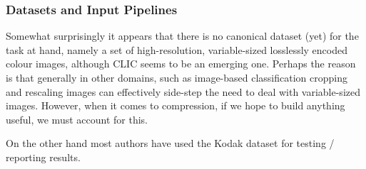 \documentclass{article}
\begin{document}
\subsubsection{Datasets and Input Pipelines}
\par
Somewhat surprisingly it appears that there is no canonical dataset (yet) for
the task at hand, namely a set of high-resolution, variable-sized losslessly
encoded colour images,
although CLIC \cite{clic2018} seems to be an emerging one. Perhaps the reason is
that generally in other domains, such as image-based classification cropping and
rescaling images can effectively side-step the need to deal with variable-sized
images. However, when it comes to compression, if we hope to build anything
useful, we must account for this.
\par
On the other hand most authors have used the Kodak dataset \cite{kodakdataset}
for testing / reporting results.
\end{document}
